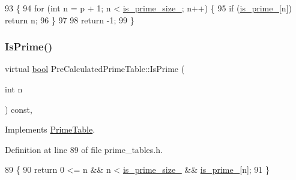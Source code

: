 \begin{DoxyCode}
93                                         \{
94     \textcolor{keywordflow}{for} (\textcolor{keywordtype}{int} n = p + 1; n < \hyperlink{classPreCalculatedPrimeTable_ad4275df41c5e5be3cad8c5abeaad1ac6}{is\_prime\_size\_}; n++) \{
95       \textcolor{keywordflow}{if} (\hyperlink{classPreCalculatedPrimeTable_ac393ebf41a32b3cba39fe67f7aa5fa38}{is\_prime\_}[n]) \textcolor{keywordflow}{return} n;
96     \}
97 
98     \textcolor{keywordflow}{return} -1;
99   \}
\end{DoxyCode}
\mbox{\label{classPreCalculatedPrimeTable_a8a9ab7f99b09e5e987933c260e7304cf}} 
\subsubsection{\texorpdfstring{Is\+Prime()}{IsPrime()}}
{\footnotesize\ttfamily virtual \hyperlink{classbool}{bool} Pre\+Calculated\+Prime\+Table\+::\+Is\+Prime (\begin{DoxyParamCaption}\item[{int}]{n }\end{DoxyParamCaption}) const\hspace{0.3cm}{\ttfamily [inline]}, {\ttfamily [virtual]}}



Implements \hyperlink{classPrimeTable_a2ab9243364ded0c51541f641b2df362a}{Prime\+Table}.



Definition at line 89 of file prime\+\_\+tables.\+h.


\begin{DoxyCode}
89                                     \{
90     \textcolor{keywordflow}{return} 0 <= n && n < \hyperlink{classPreCalculatedPrimeTable_ad4275df41c5e5be3cad8c5abeaad1ac6}{is\_prime\_size\_} && \hyperlink{classPreCalculatedPrimeTable_ac393ebf41a32b3cba39fe67f7aa5fa38}{is\_prime\_}[n];
91   \}
\end{DoxyCode}
\mbox{\label{classPreCalculatedPrimeTable_a67012c43b78cee27b891a9934becc455}} 
